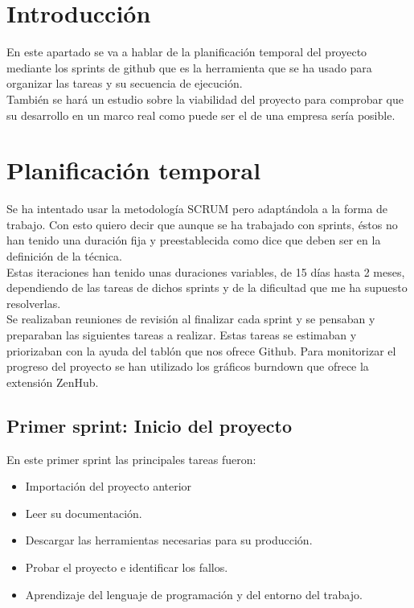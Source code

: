 
\section{Introducción}
En este apartado se va a hablar de la planificación temporal del proyecto mediante los sprints de github que es la herramienta que se ha usado para organizar las tareas y su secuencia de ejecución.\\
También se hará un estudio sobre la viabilidad del proyecto para comprobar que su desarrollo en un marco real como puede ser el de una empresa sería posible.
\section{Planificación temporal}
Se ha intentado usar la metodología SCRUM pero adaptándola a la forma de trabajo. Con esto quiero decir que aunque se ha trabajado con sprints, éstos no han tenido una duración fija y preestablecida como dice que deben ser en la definición de la técnica.\\
Estas iteraciones han tenido unas duraciones variables, de 15 días hasta 2 meses, dependiendo de las tareas de dichos sprints y de la dificultad que me ha supuesto resolverlas.\\
Se realizaban reuniones de revisión al finalizar cada sprint y se pensaban y preparaban las siguientes tareas a realizar.
Estas tareas se estimaban y priorizaban con la ayuda del tablón que nos ofrece Github.
Para monitorizar el progreso del proyecto se han utilizado los gráficos burndown que ofrece la extensión ZenHub.
\subsection{Primer sprint: Inicio del proyecto}
En este primer sprint las principales tareas fueron:
\begin{itemize}
    \item Importación del proyecto anterior
    \item Leer su documentación.
    \item Descargar las herramientas necesarias para su producción.
    \item Probar el proyecto e identificar los fallos.
    \item Aprendizaje del lenguaje de programación y del entorno del trabajo.
\end{itemize}
